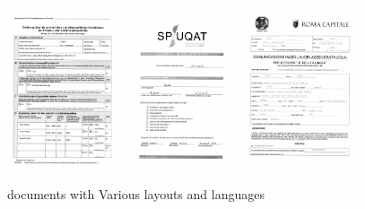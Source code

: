 \begin{figure}[ht]
\includegraphics[width=0.3\textwidth]{chapters/images/de_train_0.jpg}\hfill
\includegraphics[width=0.3\textwidth]{chapters/images/Literature_review/Different_documents/fr_train_51.jpg}\hfill
\includegraphics[width=0.3\textwidth]{chapters/images/Literature_review/Different_documents/it_train_24.jpg}

\caption{documents with Various layouts and languages \cite{xfund}}
    \label{fig:different_documents}
\end{figure}


